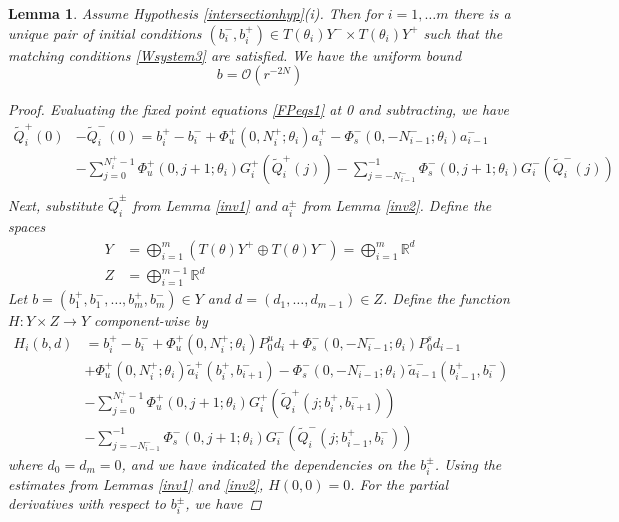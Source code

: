 \documentclass[12pt]{article}
\def\R{{\mathbb R}}
\newtheorem{lemma}{Lemma}
\begin{document}
\begin{lemma}\label{inv3t}
Assume Hypothesis \ref{intersectionhyp}(i). Then for $i = 1, \dots m$ there is a unique pair of initial conditions $(b_i^-, b_i^+) \in T(\theta_i) Y^- \times T(\theta_i) Y^+$ such that the matching conditions \eqref{Wsystem3} are satisfied. We have the uniform bound
\begin{equation}\label{bboundt}
b = \mathcal{O}(r^{-2N})
\end{equation}

\begin{proof}
Evaluating the fixed point equations \eqref{FPeqs1} at 0 and subtracting, we have
\begin{align*}
\tilde{Q}_i^+(0) &- \tilde{Q}_i^-(0) = b_i^+ - b_i^- 
+ \Phi_u^+(0, N_i^+; \theta_i) a_i^+ - \Phi_s^-(0, -N_{i-1}^-; \theta_i) a_{i-1}^- \\
&- \sum_{j = 0}^{N_i^+-1} \Phi_u^+(0, j+1; \theta_i) G_i^+(\tilde{Q}_i^+(j)) 
- \sum_{j = -N_{i-1}^-}^{-1} \Phi_s^-(0, j+1; \theta_i) G_i^-(\tilde{Q}_i^-(j)) \\
\end{align*}
Next, substitute $\tilde{Q}_i^\pm$ from Lemma \ref{inv1} and $a_i^\pm$ from Lemma \ref{inv2}. Define the spaces
\begin{align}\label{spaceYt}
Y &= \bigoplus_{i=1}^m (T(\theta) Y^+ \oplus T(\theta) Y^-) = \bigoplus_{i=1}^m \R^d \\
Z &= \bigoplus_{i=1}^{m-1} \R^d
\end{align}
Let $b = (b_1^+, b_1^-, \dots, b_m^+, b_m^-) \in Y$ and $d = (d_1, \dots, d_{m-1}) \in Z$. Define the function $H: Y \times Z \rightarrow Y$ component-wise by
\begin{align*}
H_i(b, d) &= 
 b_i^+ - b_i^- + \Phi_u^+(0, N_i^+; \theta_i) P_0^u d_i + \Phi_s^-(0, -N_{i-1}^-; \theta_i) P_0^s d_{i-1} \\
&+ \Phi_u^+(0, N_i^+; \theta_i) \tilde{a}_i^+(b_i^+, b_{i+1}^-) 
- \Phi_s^-(0, -N_{i-1}^-; \theta_i) \tilde{a}_{i-1}^-(b_{i-1}^+, b_i^-) \\
&- \sum_{j = 0}^{N_i^+-1} \Phi_u^+(0, j+1; \theta_i) G_i^+(\tilde{Q}_i^+(j; b_i^+, b_{i+1}^-)) \\
&- \sum_{j = -N_{i-1}^-}^{-1} \Phi_s^-(0, j+1; \theta_i) G_i^-(\tilde{Q}_i^-(j; b_{i-1}^+, b_i^-))
\end{align*}
where $d_0 = d_m = 0$, and we have indicated the dependencies on the $b_i^\pm$. Using the estimates from Lemmas \ref{inv1} and \ref{inv2}, $H(0, 0) = 0$. For the partial derivatives with respect to $b_i^\pm$, we have

\end{proof}
\end{lemma}
\end{document}

